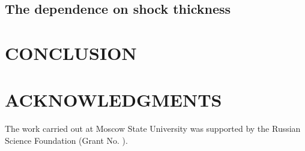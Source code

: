 \documentclass[letterpaper,11pt,oneside,reqno]{amsart}
\numberwithin{equation}{section}
\theoremstyle{definition}
\theoremstyle{qqq}
\begin{document}
\subsection{The dependence on shock thickness}


\section{CONCLUSION}

\section{ACKNOWLEDGMENTS}
The work carried out at Moscow State University was supported by the Russian Science Foundation (Grant No. ).

\end{document}

